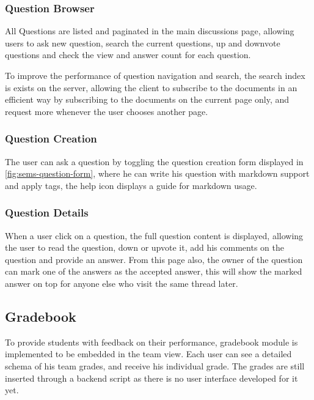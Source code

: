 \subsubsection{Question Browser}
\label{subs:question-browser}
All Questions are listed and paginated in the main discussions page, allowing users to ask new question, search the current questions, up and
downvote questions and check the view and answer count for each question.

\newParagraph
To improve the performance of question navigation and search, the search index is exists on the server, allowing the client to subscribe to
the documents in an efficient way by subscribing to the documents on the current page only, and request more whenever the user chooses another page.

\subsubsection{Question Creation}
\label{subs:question-creation}
The user can ask a question by toggling the question creation form displayed in \ref{fig:sems-question-form}, where he can
write his question with markdown support and apply tags, the help icon displays a guide for markdown usage.

\subsubsection{Question Details}
\label{subs:question-details}
When a user click on a question, the full question content is displayed, allowing the user to read the question, down or upvote it, add his comments
on the question and provide an answer. From this page also, the owner of the question can mark one of the answers as the accepted answer, this
will show the marked answer on top for anyone else who visit the same thread later.


\subsection{Gradebook}
\label{sub:gradebook}
To provide students with feedback on their performance, gradebook module is implemented to be embedded in the team view. Each
user can see a detailed schema of his team grades, and receive his individual grade. The grades are still inserted through a backend
script as there is no user interface developed for it yet.

